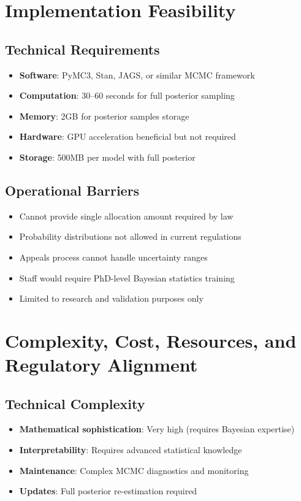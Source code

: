 \section{Implementation Feasibility}

\subsection{Technical Requirements}

\begin{itemize}
    \item \textbf{Software}: PyMC3, Stan, JAGS, or similar MCMC framework
    \item \textbf{Computation}: 30--60 seconds for full posterior sampling
    \item \textbf{Memory}: 2GB for posterior samples storage
    \item \textbf{Hardware}: GPU acceleration beneficial but not required
    \item \textbf{Storage}: 500MB per model with full posterior
\end{itemize}

\subsection{Operational Barriers}

\begin{itemize}
    \item Cannot provide single allocation amount required by law
    \item Probability distributions not allowed in current regulations
    \item Appeals process cannot handle uncertainty ranges
    \item Staff would require PhD-level Bayesian statistics training
    \item Limited to research and validation purposes only
\end{itemize}

\section{Complexity, Cost, Resources, and Regulatory Alignment}

\subsection{Technical Complexity}

\begin{itemize}
    \item \textbf{Mathematical sophistication}: Very high (requires Bayesian expertise)
    \item \textbf{Interpretability}: Requires advanced statistical knowledge
    \item \textbf{Maintenance}: Complex MCMC diagnostics and monitoring
    \item \textbf{Updates}: Full posterior re-estimation required
\end{itemize}

